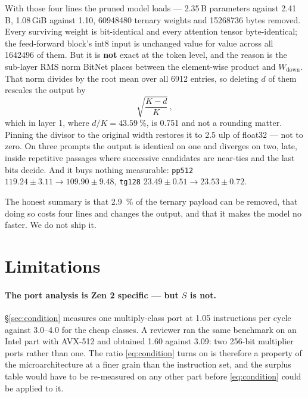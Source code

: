 \documentclass[11pt,a4paper]{article}
\newcommand{\code}[1]{\texttt{#1}}
\begin{document}
With those four lines the pruned model loads --- \num{2.35}\,B parameters
against \num{2.41}\,B, \num{1.08}\,GiB against \num{1.10}, \num{60948480}
ternary weights and \num{15268736} bytes removed. Every surviving weight is
bit-identical and every attention tensor byte-identical; the feed-forward
block's int8 input is unchanged value for value across all \num{1642496} of
them. But it is \textbf{not} exact at the token level, and the reason is the
sub-layer RMS norm BitNet places between the element-wise product and
$W_{\text{down}}$. That norm divides by the root mean over all \num{6912}
entries, so deleting $d$ of them rescales the output by
\[
    \sqrt{\frac{K-d}{K}}\,,
\]
which in layer 1, where $d/K = \SI{43.59}{\percent}$, is \num{0.751} and not a
rounding matter. Pinning the divisor to the original width restores it to
\num{2.5} ulp of float32 --- not to zero. On three prompts the output is
identical on one and diverges on two, late, inside repetitive passages where
successive candidates are near-ties and the last bits decide. And it buys
nothing measurable: \code{pp512} $\num{119.24} \pm \num{3.11} \to
\num{109.90} \pm \num{9.48}$, \code{tg128} $\num{23.49} \pm \num{0.51} \to
\num{23.53} \pm \num{0.72}$.

The honest summary is that \SI{2.9}{\percent} of the ternary payload can be
removed, that doing so costs four lines and changes the output, and that it
makes the model no faster. We do not ship it.

\section{Limitations}\label{sec:limits}

\paragraph{The port analysis is Zen 2 specific --- but $S$ is not.}
\S\ref{sec:condition} measures one multiply-class port at \num{1.05}
instructions per cycle against \numrange{3.0}{4.0} for the cheap classes. A
reviewer ran the same benchmark on an Intel part with AVX-512 and obtained
\num{1.60} against \num{3.09}: two 256-bit multiplier ports rather than one. The
ratio \eqref{eq:condition} turns on is therefore a property of the
microarchitecture at a finer grain than the instruction set, and the surplus
table would have to be re-measured on any other part before \eqref{eq:condition}
could be applied to it.
\end{document}
